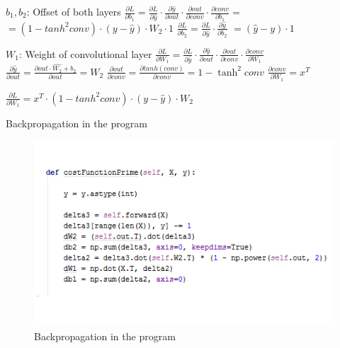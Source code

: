 \documentclass[12pt]{beamer}
\begin{document}
\begin{frame}{$b_1, b_2$: Offset of both layers}
\Large
$\frac{\partial{L}}{\partial{b_1}} = \frac{\partial{L}}{\partial{\hat{y}}} \cdot \frac{\partial{\hat{y}}}{\partial{out}}\cdot \frac{\partial{out}}{\partial{conv}} \cdot \frac{\partial{conv}}{\partial{b_1}} = $
\newline\noindent\makebox[\linewidth]{\rule{\paperwidth}{0.4pt}}
$ =  (1-tanh^2{conv}) \cdot (y-\hat{y}) \cdot W_2 \cdot 1$ \newline \newline
$\frac{\partial{L}}{\partial{b_2}} = \frac{\partial{L}}{\partial{\hat{y}}} \cdot \frac{\partial{\hat{y}}}{\partial{b_2}}$\newline\noindent\makebox[\linewidth]{\rule{\paperwidth}{0.4pt}}
$ = (\hat{y}-y) \cdot 1$\newline \newline

\end{frame}
\begin{frame}{$W_1$: Weight of convolutional layer}
\large
$\frac{\partial{L}}{\partial{W_1}} = \frac{\partial{L}}{\partial{\hat{y}}} \cdot \frac{\partial{\hat{y}}}{\partial{out}}\cdot \frac{\partial{out}}{\partial{conv}} \cdot \frac{\partial{conv}}{\partial{W_1}}$
\newline
$\frac{\partial{\hat{y}}}{\partial{out}} = \frac{\partial{\hat{out \cdot W_2 +b_2}}}{\partial{out}} =W_2$
$\frac{\partial{out}}{\partial{conv}} = \frac{\partial{ tanh(conv)}}{\partial{conv}} = 1 - \tanh^2{conv}$ 
$\frac{\partial{conv}}{\partial{W_1}} = x^T$
\newline\noindent\makebox[\linewidth]{\rule{\paperwidth}{0.4pt}}

$\frac{\partial{L}}{\partial{W_1}} = x^T \cdot (1-tanh^2{conv}) \cdot (y-\hat{y}) \cdot W_2 $








\end{frame}



\begin{frame}{Backpropagation in the program}

\begin{figure}
\centering
\includegraphics[width = 0.8\linewidth]{images/backpropagation.png}
\caption{Backpropagation in the program}
\label{fig:Backpropagation}
\end{figure}

\end{frame}
\end{document}
